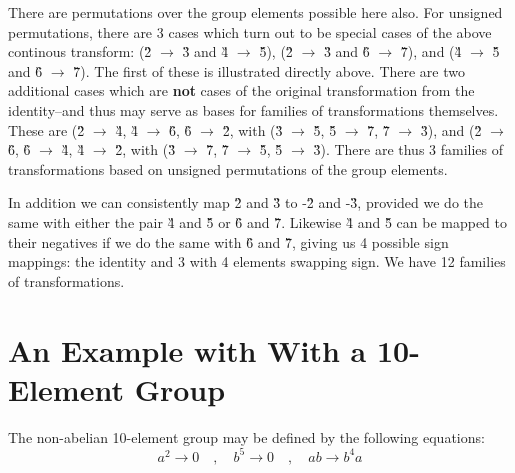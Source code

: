 \documentclass[12pt]{article}
\begin{document}
  There are permutations over the group elements possible here also.
For unsigned permutations, there are 3 cases which turn out to be
special cases of the above continous transform:  (\G2 $\rightarrow$ \G3
and \G4 $\rightarrow$ \G5), (\G2 $\rightarrow$ \G3 and \G6 $\rightarrow$ \G7),
and (\G4 $\rightarrow$ \G5 and \G6 $\rightarrow$ \G7).  The first of these
is illustrated directly above.  There are two additional cases which are
{\bf not} cases of the original transformation from the identity--and thus
may serve as bases for families of transformations themselves.  These are
(\G2 $\rightarrow$ \G4, \G4 $\rightarrow$ \G6, \G6 $\rightarrow$ \G2, with
(\G3 $\rightarrow$ \G5, \G5 $\rightarrow$ \G7, \G7 $\rightarrow$ \G3), and
(\G2 $\rightarrow$ \G6, \G6 $\rightarrow$ \G4, \G4 $\rightarrow$ \G2, with
(\G3 $\rightarrow$ \G7, \G7 $\rightarrow$ \G5, \G5 $\rightarrow$ \G3).
There are thus 3 families of transformations based on unsigned permutations
of the group elements.

 In addition we can consistently map \G2 and \G3 to -\G2 and -\G3, provided
we do the same with either the pair \G4 and \G5 or \G6 and \G7.  Likewise
\G4 and \G5 can be mapped to their negatives if we do the same with
\G6 and \G7, giving us 4 possible sign mappings:  the identity and 3 with
4 elements swapping sign.  We have 12 families of transformations.

\section{ An Example with With a 10-Element Group}
 The non-abelian 10-element group
may be defined by the following equations:
\begin{equation}
a^2 \rightarrow 0 \quad , \quad b^5 \rightarrow 0 \quad , \quad a b \rightarrow
b^4 a
\end{equation}
\end{document}
